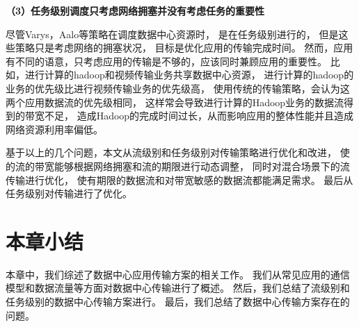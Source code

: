 \textbf{（3）任务级别调度只考虑网络拥塞并没有考虑任务的重要性}

尽管Varys，Aalo等策略在调度数据中心资源时，
是在任务级别进行的，
但是这些策略只是考虑网络的拥塞状况，
目标是优化应用的传输完成时间。
然而，应用有不同的语意，只考虑应用的传输是不够的，应该同时兼顾应用的重要性。
比如，进行计算的hadoop和视频传输业务共享数据中心资源，
进行计算的hadoop的业务的优先级比进行视频传输业务的优先级高，
使用传统的传输策略，会认为这两个应用数据流的优先级相同，
这样常会导致进行计算的Hadoop业务的数据流得到的带宽不足，
造成Hadoop的完成时间过长，从而影响应用的整体性能并且造成网络资源利用率偏低。

基于以上的几个问题，本文从流级别和任务级别对传输策略进行优化和改进，
使的流的带宽能够根据网络拥塞和流的期限进行动态调整，
同时对混合场景下的流传输进行优化，
使有期限的数据流和对带宽敏感的数据流都能满足需求。
最后从任务级别对传输进行了优化。

\section{本章小结}
本章中，我们综述了数据中心应用传输方案的相关工作。
我们从常见应用的通信模型和数据流量等方面对数据中心传输进行了概述。
然后，我们总结了流级别和任务级别的数据中心传输方案进行。
最后，我们总结了数据中心传输方案存在的问题。














